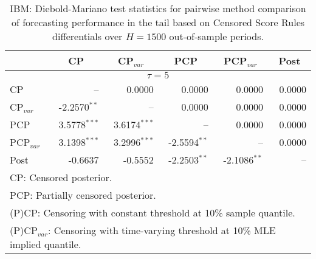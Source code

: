 { \renewcommand{\arraystretch}{1.2} 
\begin{table} 
\center 
\begin{tabular}{l | rrrrr} 
& \multicolumn{1}{c}{CP}& \multicolumn{1}{c}{CP$_{var}$}& \multicolumn{1}{c}{PCP}& \multicolumn{1}{c}{PCP$_{var}$}& \multicolumn{1}{c}{Post} \\ \hline 
\multicolumn{6}{c}{$\tau = 5$} \\ \hline 
CP &    --\phantom{$^{***}$} & 0.0000\phantom{$^{***}$} & 0.0000\phantom{$^{***}$} & 0.0000\phantom{$^{***}$} & 0.0000\phantom{$^{***}$}   \\ 
CP$_{var}$ & -2.2570$^{**}$\phantom{$^{*}$} &    --\phantom{$^{***}$} & 0.0000\phantom{$^{***}$} & 0.0000\phantom{$^{***}$} & 0.0000\phantom{$^{***}$}   \\ 
PCP & 3.5778$^{***}$ & 3.6174$^{***}$ &    --\phantom{$^{***}$} & 0.0000\phantom{$^{***}$} & 0.0000\phantom{$^{***}$}   \\ 
PCP$_{var}$ & 3.1398$^{***}$ & 3.2996$^{***}$ & -2.5594$^{**}$\phantom{$^{*}$} &    --\phantom{$^{***}$} & 0.0000\phantom{$^{***}$}   \\ 
Post & -0.6637\phantom{$^{***}$} & -0.5552\phantom{$^{***}$} & -2.2503$^{**}$\phantom{$^{*}$} & -2.1086$^{**}$\phantom{$^{*}$} &    --\phantom{$^{***}$}   \\ 
\hline 
\multicolumn{6}{l}{\footnotesize{CP: Censored posterior.}}  \\ 
\multicolumn{6}{l}{\footnotesize{PCP: Partially censored posterior.}} \\ 
\multicolumn{6}{l}{\footnotesize{(P)CP: Censoring with constant threshold at 10\% sample quantile.}}  \\ 
\multicolumn{6}{l}{\footnotesize{(P)CP$_{var}$: Censoring with time-varying threshold at 10\% MLE implied quantile.}} \\ 
\end{tabular}
 \caption{IBM: Diebold-Mariano test statistics for  pairwise method comparison of forecasting performance in the tail based on  Censored Score Rules differentials over $H=1500$ out-of-sample periods. }
\label{tab:IBM_DMv_5}  
\end{table}
}